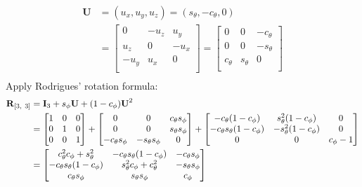 \begin{align*}
  \textbf{U} &= (u_x, u_y, u_z) =
  (s_\theta, -c_\theta, 0) \\ 
  &=
  \begin{bmatrix}
  0 & -u_z & u_y  \\
  u_z & 0 & -u_x \\
  -u_y & u_x & 0 \\
  \end{bmatrix} =
  \begin{bmatrix}
    0 & 0 & -c_\theta \\
    0 & 0 & -s_\theta \\
    c_\theta & s_\theta & 0 \\
  \end{bmatrix} \\
  \end{align*} Apply Rodrigues' rotation formula: \begin{align*}
    \textbf{R}_{[3,~3]} 
    &= \textbf{I}_3 + s_\phi\*\textbf{U} + (1-c_\phi)\*\textbf{U}^2 \\
        &=
    \begin{bmatrix}
      1&0&0 \\ 0&1&0 \\ 0&0&1 \\
    \end{bmatrix} +
    \begin{bmatrix}
      0 & 0 & c_\theta s_\phi \\
      0 & 0 & s_\theta s_\phi \\
      -c_\theta s_\phi & -s_\theta s_\phi & 0 \\
    \end{bmatrix} +
    \begin{bmatrix}
      -c_\theta (1-c_\phi) & s^2_\theta (1-c_\phi) & 0 \\
      -c_\theta s_\theta (1-c_\phi) & -s^2_\theta (1-c_\phi) & 0 \\
      0 & 0 & c_\phi-1 \\
    \end{bmatrix} \\
    &= 
    \begin{bmatrix}
      c_\theta^2 c_\phi + s_\theta^2 &
      -c_\theta s_\theta (1 - c_\phi) &
      -c_\theta s_\phi \\
      -c_\theta s_\theta (1 - c_\phi) &
      s_\theta^2 c_\phi + c_\theta^2 &
      -s_\theta s_\phi \\
      c_\theta s_\phi &
      s_\theta s_\phi &
      c_\phi
    \end{bmatrix} \\
\end{align*}


